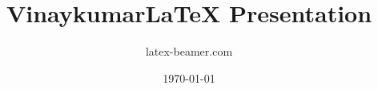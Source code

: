\documentclass{beamer}
\title{Vinaykumar\LaTeX{} Presentation}
\author{latex-beamer.com}
\date{\today}
\begin{document}
\begin{frame}
    \titlepage
\end{frame}





\end{document}
